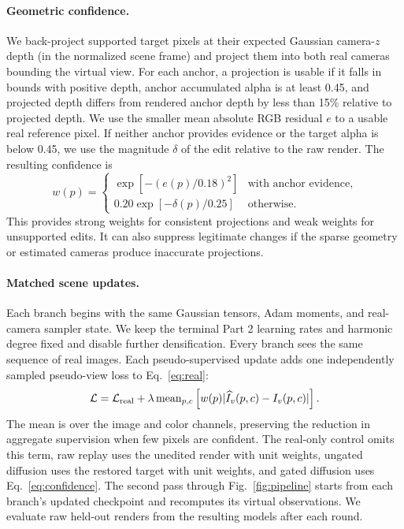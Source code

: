 \paragraph{Geometric confidence.}
We back-project supported target pixels at their expected Gaussian camera-$z$ depth (in the normalized scene frame) and project them into both real cameras bounding the virtual view. For each anchor, a projection is usable if it falls in bounds with positive depth, anchor accumulated alpha is at least 0.45, and projected depth differs from rendered anchor depth by less than 15\% relative to projected depth. We use the smaller mean absolute RGB residual $e$ to a usable real reference pixel. If neither anchor provides evidence or the target alpha is below 0.45, we use the magnitude $\delta$ of the edit relative to the raw render. The resulting confidence is
\begin{equation}
  w(p) = \begin{cases}
    \exp[-(e(p)/0.18)^2] & \text{with anchor evidence},\\
    0.20\exp[-\delta(p)/0.25] & \text{otherwise}.
  \end{cases}
  \label{eq:confidence}
\end{equation}
This provides strong weights for consistent projections and weak weights for unsupported edits. It can also suppress legitimate changes if the sparse geometry or estimated cameras produce inaccurate projections.

\paragraph{Matched scene updates.}
Each branch begins with the same Gaussian tensors, Adam moments, and real-camera sampler state. We keep the terminal Part 2 learning rates and harmonic degree fixed and disable further densification. Every branch sees the same sequence of real images. Each pseudo-supervised update adds one independently sampled pseudo-view loss to Eq.~\eqref{eq:real}:
\begin{equation}
  \mathcal L=\mathcal L_{\rm real}+\lambda\,\mathrm{mean}_{p,c}\left[w(p)|\widehat I_v(p,c)-I_v(p,c)|\right].
  \label{eq:fusion}
\end{equation}
The mean is over the image and color channels, preserving the reduction in aggregate supervision when few pixels are confident. The real-only control omits this term, raw replay uses the unedited render with unit weights, ungated diffusion uses the restored target with unit weights, and gated diffusion uses Eq.~\eqref{eq:confidence}. The second pass through Fig.~\ref{fig:pipeline} starts from each branch's updated checkpoint and recomputes its virtual observations. We evaluate raw held-out renders from the resulting models after each round.
